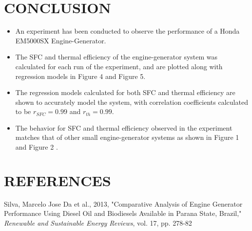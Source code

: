 \documentclass[12pt]{article}
\begin{document}
\section*{\fontsize{12}{12}\selectfont CONCLUSION}

\begin{itemize}

\item An experiment has been conducted to observe the performance of a Honda EM5000SX Engine-Generator.

\item The SFC and thermal efficiency of the engine-generator system was calculated for each run of the experiment, and are plotted along with regression models in Figure 4 and Figure 5.

\item The regression models calculated for both SFC and thermal efficiency are shown to accurately model the system, with correlation coefficients calculated to be $r_{SFC} = 0.99$ and $r_{th} = 0.99$.

\item The behavior for SFC and thermal efficiency observed in the experiment matches that of other small engine-generator systems as shown in Figure 1 and Figure 2 \cite{Silva}.

\end{itemize}



\section*{\fontsize{12}{12}\selectfont REFERENCES}

\begin{thebibliography}{2}

Silva, Marcelo Jose Da et al., 2013, "Comparative Analysis of Engine Generator Performance Using Diesel Oil and Biodiesels Available in Parana State, Brazil," \emph{Renewable and Sustainable Energy Reviews}, vol. 17, pp. 278-82
\end{thebibliography}
\end{document}
